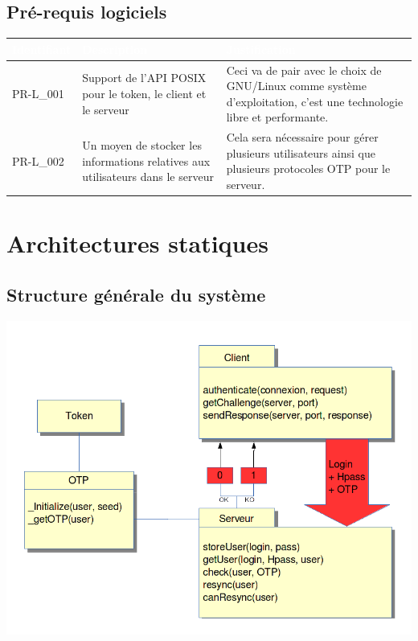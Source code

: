 \documentclass{"../../res/univ-projet"}
\begin{document}
\subsection{Pré-requis logiciels}
\begin{tabular}{|p{}|p{}|p{}|}
    \hline
    \rowcolor{gray}
    \textcolor{white}{\bfseries Identifiant} & 
    \textcolor{white}{\bfseries Description} &
    \textcolor{white}{\bfseries Justification} \\
    \hline
    PR-L\_001 &
    Support de l'API POSIX pour le token, le client et le serveur &
    Ceci va de pair avec le choix de GNU/Linux comme système d'exploitation,
    c'est une technologie libre et performante.\\
    \hline
    PR-L\_002 &
    Un moyen de stocker les informations relatives aux utilisateurs dans le serveur&
    Cela sera n\'ecessaire pour g\'erer plusieurs utilisateurs ainsi que plusieurs protocoles
    OTP pour le serveur.\\
    \hline
\end{tabular}


\section{Architectures statiques}
\subsection{Structure g\'en\'erale du syst\`eme}
\includegraphics[width=\textwidth]{../graphics/architecture.png}
\end{document}
